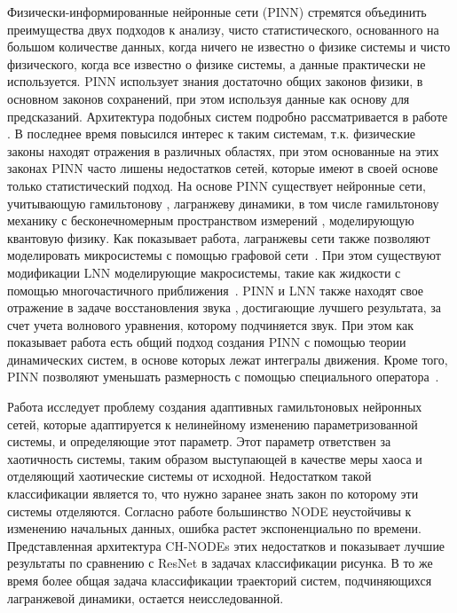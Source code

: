 \documentclass[a4paper, 12pt]{article}
\begin{document}
	Физически-информированные нейронные сети (PINN) стремятся объединить преимущества двух подходов к анализу, чисто статистического, основанного на большом количестве данных, когда ничего не известно о физике системы и чисто физического, когда все известно о физике системы, а данные практически не используется. PINN использует знания достаточно общих законов физики, в основном законов сохранений, при этом используя данные как основу для предсказаний. Архитектура подобных систем подробно рассматривается в работе \cite{PINNreview}. В последнее время повысился интерес к таким системам, т.к. физические законы находят отражения в различных областях, при этом основанные на этих законах PINN часто лишены недостатков сетей, которые имеют в своей основе только статистический подход. На основе PINN существует нейронные сети, учитывающую гамильтонову \cite{HNN}, лагранжеву динамики\cite{article}, в том числе гамильтонову механику с бесконечномерным пространством измерений \cite{quantumHNN}, моделирующую квантовую физику. Как показывает работа, лагранжевы сети также позволяют моделировать микросистемы с помощью графовой сети~\cite{LGNN}. При этом существуют модификации LNN моделирующие макросистемы, такие как жидкости с помощью многочастичного приближения~\cite{fluid-LNN}. PINN и LNN также находят свое отражение в задаче восстановления звука \cite{PINNsoundwave}, достигающие лучшего результата, за счет учета волнового уравнения, которому подчиняется звук. При этом как показывает работа есть общий подход создания PINN с помощью теории динамических систем, в основе которых лежат интегралы движения. Кроме того, PINN позволяют уменьшать размерность с помощью специального оператора~\cite{HNNreduce}.

Работа \cite{HNNadapt} исследует проблему создания адаптивных гамильтоновых нейронных сетей, которые адаптируется к нелинейному изменению параметризованной системы, и определяющие этот параметр. Этот параметр ответствен за хаотичность системы, таким образом выступающей в качестве меры хаоса и отделяющий хаотические системы от исходной. Недостатком такой классификации является то, что нужно заранее знать закон по которому эти системы отделяются. Согласно работе \cite{HNNrobustclass} большинство NODE неустойчивы к изменению начальных данных, ошибка растет экспоненциально по времени. Представленная архитектура CH-NODEs этих недостатков и показывает лучшие результаты по сравнению с ResNet в задачах классификации рисунка. В то же время более общая задача классификации траекторий систем, подчиняющихся лагранжевой динамики, остается неисследованной. 
\end{document}
